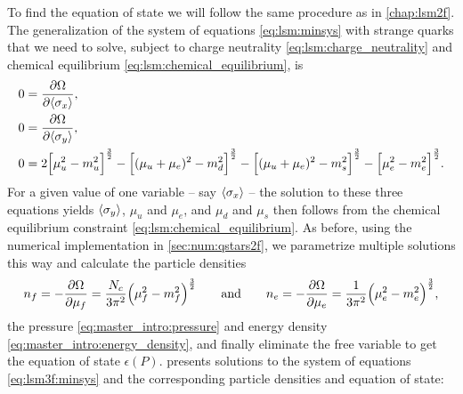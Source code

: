 To find the equation of state we will follow the same procedure as in \cref{chap:lsm2f}.
The generalization of the system of equations \eqref{eq:lsm:minsys} with strange quarks that we need to solve,
subject to charge neutrality \eqref{eq:lsm:charge_neutrality} and chemical equilibrium \eqref{eq:lsm:chemical_equilibrium},
is
\begin{subequations}
\begin{align}
	0 &= \pdv{\Omega}{ \langle \sigma_x \rangle} , \label{eq:lsm3f:minsys_minx} \\
	0 &= \pdv{\Omega}{ \langle \sigma_y \rangle} , \label{eq:lsm3f:minsys_miny} \\
	0 &= 2 \Big[\mu_u^2-m_u^2\Big]^\frac32 - \Big[(\mu_u+\mu_e)^2-m_d^2\Big]^\frac32 - \Big[(\mu_u+\mu_e)^2-m_s^2\Big]^\frac32 - \Big[\mu_e^2-m_e^2\Big]^\frac32 \label{eq:lsm:minsys3f_charge}.
\end{align}%
\label{eq:lsm3f:minsys}%
\end{subequations}%
For a given value of one variable -- say $\langle \sigma_x \rangle$ --
the solution to these three equations yields $\langle \sigma_y \rangle$, $\mu_u$ and $\mu_e$,
and $\mu_d$ and $\mu_s$ then follows from the chemical equilibrium constraint \eqref{eq:lsm:chemical_equilibrium}.
As before, using the numerical implementation in \cref{sec:num:qstars2f},
we parametrize multiple solutions this way and calculate the particle densities
\begin{equation}
	n_f = -\pdv{\Omega}{\mu_f} = \frac{N_c}{3 \pi^2} \Big( \mu_f^2 - m_f^2 \Big)^{\frac32}
	\qquad \text{and} \qquad
	n_e = -\pdv{\Omega}{\mu_e} = \frac{  1}{3 \pi^2} \Big( \mu_e^2 - m_e^2 \Big)^{\frac32},
\label{eq:lsm3f:particle_densities}
\end{equation}%
the pressure \eqref{eq:master_intro:pressure} and energy density \eqref{eq:master_intro:energy_density}, and finally eliminate the free variable to get the equation of state $\epsilon(P)$.
 presents solutions to the system of equations \eqref{eq:lsm3f:minsys} and the corresponding particle densities and equation of state:
